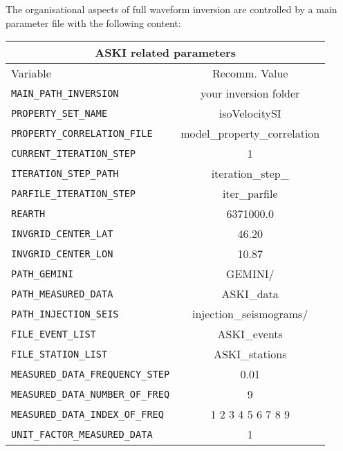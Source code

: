 The organisational aspects of full waveform inversion are controlled by a main parameter file with the following content:
\newpage
%
 \begin{longtable}{|p{10.0cm}|c|}\hline
	\multicolumn{2}{|c|}{\textbf{ASKI related parameters}} \\\hline
	Variable & Recomm. Value \\ \hline
	\verb+MAIN_PATH_INVERSION+            &   your inversion folder         \\ \hline
	\verb+PROPERTY_SET_NAME+              &   isoVelocitySI                 \\ \hline
	\verb+PROPERTY_CORRELATION_FILE+      &   model\_property\_correlation  \\ \hline
	\verb+CURRENT_ITERATION_STEP+         &   1                             \\ \hline
	\verb+ITERATION_STEP_PATH+            &   iteration\_step\_             \\ \hline
	\verb+PARFILE_ITERATION_STEP+         &   iter\_parfile                 \\ \hline
   \verb+REARTH+                         &   6371000.0                     \\ \hline
	\verb+INVGRID_CENTER_LAT+             &   46.20                         \\ \hline
	\verb+INVGRID_CENTER_LON+             &   10.87                         \\ \hline
	\verb+PATH_GEMINI+                    &   GEMINI/                       \\ \hline
	\verb+PATH_MEASURED_DATA+             &   ASKI\_data                    \\ \hline
   \verb+PATH_INJECTION_SEIS+            &   injection\_seismograms/       \\ \hline
   \verb+FILE_EVENT_LIST+                &   ASKI\_events                  \\ \hline
   \verb+FILE_STATION_LIST+              &   ASKI\_stations                \\ \hline
   \verb+MEASURED_DATA_FREQUENCY_STEP+   &   0.01                          \\ \hline
   \verb+MEASURED_DATA_NUMBER_OF_FREQ+   &   9                             \\ \hline
   \verb+MEASURED_DATA_INDEX_OF_FREQ+    &   1 2 3 4 5 6 7 8 9             \\ \hline
   \verb+UNIT_FACTOR_MEASURED_DATA+      &   1                             \\ \hline

\end{longtable}
